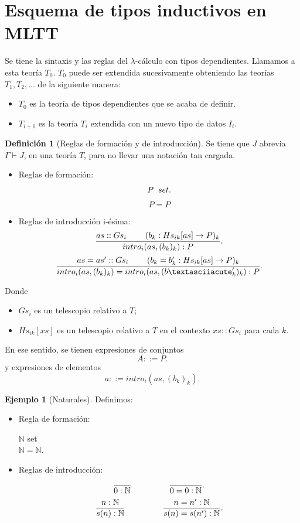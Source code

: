 \documentclass[11pt,oneside]{report}
\theoremstyle{plain}
\theoremstyle{definition}
\newtheorem{defi}{Definición}[chapter]
\newtheorem{ejemplo}{Ejemplo}[chapter]
\newcommand{\N}{\mathbb{N}}
\begin{document}
\section{Esquema de tipos inductivos en MLTT}
Se tiene la sintaxis y las reglas del $\lambda$-cálculo con tipos dependientes. Llamamos a esta teoría $T_{0}$. $T_{0}$ puede ser extendida sucesivamente obteniendo las teorías $T_{1}, T_{2}, \ldots$ de la siguiente manera:
    \begin{itemize}
        \item $T_{0}$ es la teoría de tipos dependientes que se acaba de definir.
        \item $T_{i+1}$ es la teoría $T_{i}$ extendida con un nuevo tipo de datos $I_{i}$.
    \end{itemize}

\begin{defi}[Reglas de formación y de introducción]
    Se tiene que $J$ abrevia $\Gamma\vdash J$, en una teoría $T$, para no llevar una notación tan cargada.
    \begin{itemize}
        \item Reglas de formación:
              $$P \hspace{2mm} set.$$
              $$P=P$$
        \item Reglas de introducción i-ésima:
                $$\frac{as::Gs_{i} \hspace{8mm} (b_{k}:Hs_{ik}[as]\to P)_{k}}{intro_{i}(as,(b_{k})_{k}) :P}.$$
                $$\frac{as=as'::Gs_{i} \hspace{8mm} (b_{k}=b'_{k}:Hs_{ik}[as]\to P)_{k}}{intro_{i}(as,(b_{k})_{k}) = intro_{i}(as,(b´'_{k})_{k}) :P}.$$
    \end{itemize}
    Donde
    \begin{itemize}
        \item $Gs_{i}$ es un telescopio relativo a $T$;

        \item $Hs_{ik}[xs]$ es un telescopio relativo a $T$ en el contexto $xs::Gs_{i}$ para cada $k$.
    \end{itemize}
\end{defi}

En ese sentido, se tienen expresiones de conjuntos
$$A::=P.$$
y expresiones de elementos
$$a::= intro_{i}(as,(b_k)_k).$$

\begin{ejemplo}[Naturales]
    Definimos:
    \begin{itemize}
        \item Regla de formación:
        \begin{center}
            $\N$ set\\
            $\N=\N$.
        \end{center}
        \item Reglas de introducción:
        $$\frac{}{0:\N} \hspace{16mm} \frac{}{0=0:\N}.$$
        $$\frac{n:\N}{s(n):\N} \hspace{16mm} \frac{n = n':\N}{s(n) = s(n'):\N}.$$
    \end{itemize}
\end{ejemplo}
\end{document}
